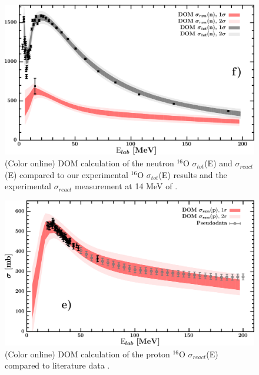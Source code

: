 \documentclass[twocolumn,secnumarabic,amssymb, nobibnotes, aps, prl,
superscriptaddress, nobalancelastpage]{revtex4}
\newcommand{\totEs}{\ensuremath{\sigma_{tot}}(E)\,\,}
\newcommand{\reacts}{\ensuremath{\sigma_{react}}\,\,}
\newcommand{\reactEs}{\ensuremath{\sigma_{react}}(E)\,\,}
\begin{document}
\begin{figure}
    \includegraphics[scale=0.35]{figures/o16_neutronInelastic.png}
    \caption{(Color online) DOM calculation of the neutron $^{16}$O \totEs and
        \reactEs compared to our experimental $^{16}$O \totEs results and the
        experimental \reacts measurement at 14 MeV of \cite{Dukarevich1967}.
    }
    \label{O16_TCS_DOMFit}
\end{figure}

\begin{figure}
    \includegraphics[scale=0.35]{figures/o16_protonInelastic.png}
    \caption{(Color online) DOM calculation of the proton $^{16}$O \reactEs compared to
        literature data \cite{Carlson}.
    }
    \label{O16_RCS_DOMFit}
\end{figure}
\end{document}
